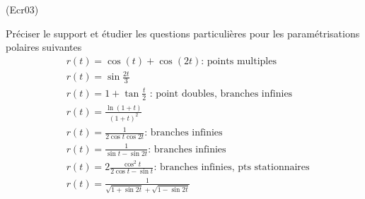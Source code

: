 \begin{tiny}(Ecr03)\end{tiny}
Préciser le support et étudier les questions particulières pour les paramétrisations polaires suivantes
\begin{align*}
 &r(t) = \cos(t) + \cos(2t)  \text{: points multiples}\\
 &r(t )=\sin \frac{2t }{3} \\
 &r(t )=1+\tan \frac{t }{2}  \text{ : point doubles, branches infinies}\\
 &r(t )=\frac{\ln (1+t)}{(1+t)^{2}}  \\
 &r(t)= \frac{1}{2\cos t\cos 2t}  \text{: branches infinies}\\
 &r(t )=\frac{1}{\sin t-\sin 2t} \text{: branches infinies}\\
 &r(t )=2\frac{\cos ^{2}t}{2\cos t-\sin t} \text{: branches infinies, pts stationnaires}\\
 &r(t)=\frac{1}{\sqrt{1+\sin 2t}+\sqrt{1-\sin 2t}}
\end{align*}